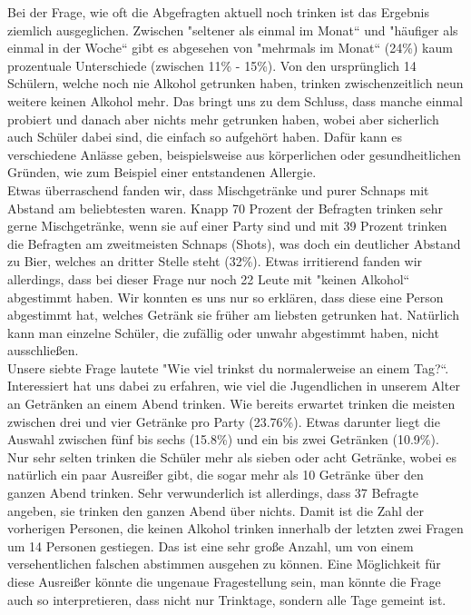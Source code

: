 \documentclass[12pt]{article}
\begin{document}
Bei der Frage, wie oft die Abgefragten aktuell noch trinken ist das Ergebnis ziemlich ausgeglichen. Zwischen "seltener als einmal im Monat“ und "häufiger als einmal in der Woche“ gibt es abgesehen von "mehrmals im Monat“ (24\%) kaum prozentuale Unterschiede (zwischen 11\% - 15\%). Von den ursprünglich 14 Schülern, welche noch nie Alkohol getrunken haben, trinken zwischenzeitlich neun weitere keinen Alkohol mehr. Das bringt uns zu dem Schluss, dass manche einmal probiert und danach aber nichts mehr getrunken haben, wobei aber sicherlich auch Schüler dabei sind, die einfach so aufgehört haben. Dafür kann es verschiedene Anlässe geben, beispielsweise aus körperlichen oder gesundheitlichen Gründen, wie zum Beispiel einer entstandenen Allergie.\\ 
Etwas überraschend fanden wir, dass Mischgetränke und purer Schnaps mit Abstand am beliebtesten waren. Knapp 70 Prozent der Befragten trinken sehr gerne Mischgetränke, wenn sie auf einer Party sind und mit 39 Prozent trinken die Befragten am zweitmeisten Schnaps (Shots), was doch ein deutlicher Abstand zu Bier, welches an dritter Stelle steht (32\%). Etwas irritierend fanden wir allerdings, dass bei dieser Frage nur noch 22 Leute mit "keinen Alkohol“ abgestimmt haben. Wir konnten es uns nur so erklären, dass diese eine Person abgestimmt hat, welches Getränk sie früher am liebsten getrunken hat. Natürlich kann man einzelne Schüler, die zufällig oder unwahr abgestimmt haben, nicht ausschließen. \\
Unsere siebte Frage lautete "Wie viel trinkst du normalerweise an einem Tag?“. Interessiert hat uns dabei zu erfahren, wie viel die Jugendlichen in unserem Alter an Getränken an einem Abend trinken. Wie bereits erwartet trinken die meisten zwischen drei und vier Getränke pro Party (23.76\%). Etwas darunter liegt die Auswahl zwischen fünf bis sechs (15.8\%) und ein bis zwei Getränken (10.9\%). Nur sehr selten trinken die Schüler mehr als sieben oder acht Getränke, wobei es natürlich ein paar Ausreißer gibt, die sogar mehr als 10 Getränke über den ganzen Abend trinken. Sehr verwunderlich ist allerdings, dass 37 Befragte angeben, sie trinken den ganzen Abend über nichts. Damit ist die Zahl der vorherigen Personen, die keinen Alkohol trinken innerhalb der letzten zwei Fragen um 14 Personen gestiegen. Das ist eine sehr große Anzahl, um von einem versehentlichen falschen abstimmen ausgehen zu können. Eine Möglichkeit für diese Ausreißer könnte die ungenaue Fragestellung sein, man könnte die Frage auch so interpretieren, dass nicht nur Trinktage, sondern alle Tage gemeint ist.\\
\end{document}
